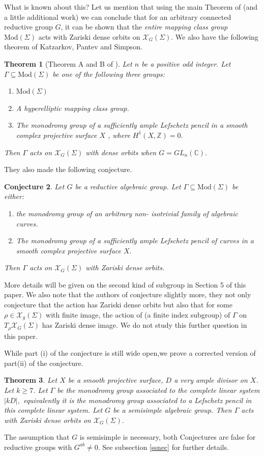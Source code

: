 \documentclass{article}
\newcommand{\XX}{\mathcal{X}}
\newcommand{\ZZ}{ \mathbb{Z}}
\newcommand{\CC}{\mathbb{C}}
\newcommand{\Mod}{\textrm{Mod}}
\newtheorem{theorem}{Theorem}[section]
\newtheorem{conjecture}[theorem]{Conjecture}
\begin{document}
What is known about this? Let us  mention that using the main Theorem of \cite{PX} (and a little additional work) we can conclude that for an arbitrary connected reductive group $G$, it can be shown that the \emph{entire mapping class group} $\Mod(\Sigma)$ acts with Zariski dense orbits on $\XX_G(\Sigma).$
We also have the following theorem of Katzarkov, Pantev and Simpson.
\begin{theorem}[Theorem A and B of \cite{KPS}]
    Let $n$ be a positive odd integer.
    Let $\Gamma \subseteq \Mod(\Sigma)$ be one of the following three groups:
    \begin{enumerate}
        \item $\Mod(\Sigma)$
        \item A hyperelliptic mapping class group.
        \item The monodromy group of a sufficiently ample Lefschetz pencil in a smooth complex projective surface $X$ , where $H^1(X,\ZZ) =0.$
    \end{enumerate}
    Then $\Gamma$ acts on $\XX_G(\Sigma)$ with dense orbits when $G=GL_{n}(\CC).$
\end{theorem}
They also made the following conjecture.
\begin{conjecture}\label{conj}
Let $G$ be a reductive algebraic group.
Let $\Gamma \subseteq \Mod(\Sigma)$ be either: 
    \begin{enumerate}
    \item the monodromy group of an arbitrary non- isotrivial family of algebraic curves.
    \item The monodromy group of a sufficiently ample Lefschetz pencil of curves in a smooth complex projective surface $X.$
    \end{enumerate}
    Then $\Gamma$ acts on $\XX_G(\Sigma)$ with Zariski dense orbits.
\end{conjecture}
More details will be given on the second kind of subgroup in Section 5 of this paper. We also note that the authors of \cite{KPS} conjecture slightly more, they not only conjecture that the action has Zariski dense orbits but also that for some $\rho \in \XX_g(\Sigma)$ with finite image, the action of (a finite index subgroup) of $\Gamma$ on $T_{\rho}\XX_G(\Sigma)$ has Zariski dense image. We do not study this further question in this paper.




While part (i) of the conjecture is still wide open,we prove a corrected version of part(ii) of the conjecture.
\begin{theorem}\label{main}
    Let $X$ be a smooth projective surface, $D$ a very ample divisor on $X$. Let $k \ge 7$. Let $\Gamma$ be the monodromy group associated to the complete linear system $|kD|,$ equivalently it is the monodromy group associated to a Lefschetz pencil in this complete linear system.
    Let $G$ be a semisimple algebraic group.  Then $\Gamma$ acts with Zariski dense orbits on $\XX_G(\Sigma).$
\end{theorem}
The assumption that $G$ is semisimple is necessary, both Conjectures are false for reductive groups with $G^{ab} \neq 0$. See subsection \ref{ssnec} for further details.
\end{document}
